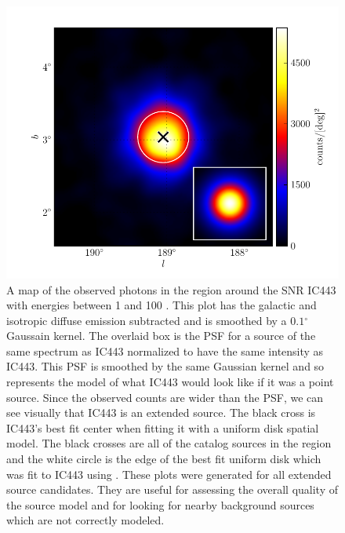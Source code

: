 \documentclass[12pt,preprint]{aastex}
\newcommand{\gev}{\text{GeV}\xspace}
\renewcommand{\deg}{\ensuremath{^\circ}\xspace}
\newcommand{\pointlike}{\text{\em pointlike}\xspace}
\begin{document}
\clearpage
\begin{figure}
  \begin{center}
    \includegraphics{ic443_plots/ic443_smoothed_counts.pdf}
    \caption{A map of the observed photons in the region around the SNR
    IC443 with energies between 1 \gev and 100 \gev.  This plot has the
    galactic and isotropic diffuse emission subtracted and is smoothed
    by a $0.1\deg$ Gaussain kernel.  The overlaid box is the PSF for
    a source of the same spectrum as IC443 normalized to have the same
    intensity as IC443.  This PSF is smoothed by the same Gaussian kernel
    and so represents the model of what IC443 would look like if it was
    a point source. Since the observed counts are wider than the PSF,
    we can see visually that IC443 is an extended source.  The black
    cross is IC443's best fit center when fitting it with a uniform
    disk spatial model. The
    black crosses are all of the catalog sources in
    the region and the white circle is the edge of the best fit
    uniform disk which was fit to IC443 using \pointlike.  These plots
    were generated for all extended source candidates.  They are useful
    for assessing the overall quality of the source model and for looking
    for nearby background sources which are not correctly modeled.}
    \label{smoothed_counts}
  \end{center}
\end{figure}
\end{document}
